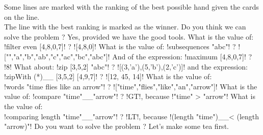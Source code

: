 Some lines are marked with the ranking of the best possible hand given the cards on the line.\\
The line with the best ranking is marked as the winner.
\lhN Do you think we can solve the problem ?
\lhA Yes, provided we have the good tools.
\lhN What is the value of:  \il!filter even [4,8,0,7]! ?
\lhA \il![4,8,0]!
\lhN What is the value of:  \il!subsequences "abc"! ?
\lhA \il!["","a","b","ab","c","ac","bc","abc"]!
\lhN And of the expression: \il!maximum [4,8,0,7]! ? 
\lhA \il!8!
\lhN What about: \il!zip [3,5,2] "abc"! ?
\lhA \il![(3,'a'),(5,'b'),(2,'c')]!
\lhN and  the expression: \il!zipWith (*)__ [3,5,2] [4,9,7]! ?
\lhA \il![12, 45, 14]!
\lhN What is the value of: \\ \il!words "time flies like an arrow"! ?
\lhA \il!["time","flies","like","an","arrow"]!
\lhN What is the value of: \il!compare "time"__"arrow"! ?
\lhA \il!GT!, because \il!"time" > "arrow"!
\lhN What is the value of:\\ \il!comparing length "time"__"arrow"! ?
\lhA \il!LT!, because \il!(length "time")__< (length "arrow)"!
\lhN Do you want to solve the problem ? 
\lhA Let's make some tea first.
\lhend








